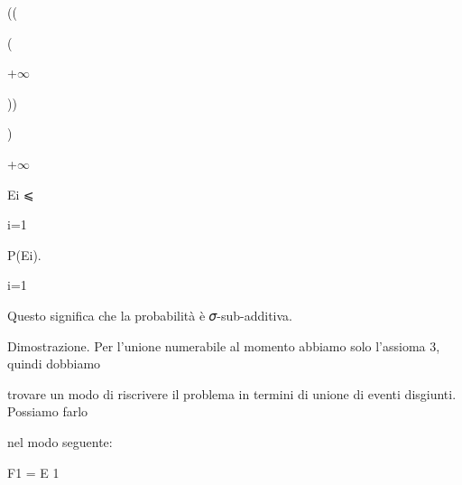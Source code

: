 \documentclass[a4paper,portrait,12pt]{article}
\begin{document}
((


(





+$\infty$





))


)





+$\infty$





\begin{flushleft}
Ei ⩽
\end{flushleft}





\begin{flushleft}
i=1
\end{flushleft}





\begin{flushleft}
P(Ei).
\end{flushleft}


\begin{flushleft}
i=1
\end{flushleft}





\begin{flushleft}
Questo significa che la probabilit\`{a} \`{e} 𝜎-sub-additiva.
\end{flushleft}


\begin{flushleft}
Dimostrazione. Per l'unione numerabile al momento abbiamo solo l'assioma 3, quindi dobbiamo
\end{flushleft}


\begin{flushleft}
trovare un modo di riscrivere il problema in termini di unione di eventi disgiunti. Possiamo farlo
\end{flushleft}


\begin{flushleft}
nel modo seguente:
\end{flushleft}


\begin{flushleft}
F1 = E 1
\end{flushleft}
\end{document}
